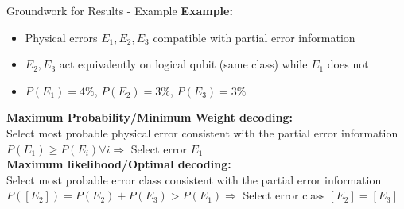 \documentclass{dfki}
\begin{document}
\begin{frame}{Groundwork for Results - Example}
\textbf{Example:}
\begin{itemize}
	\item Physical errors $E_{1}, E_{2}, E_{3}$ compatible with partial error information\\
	\pause
	\item $E_{2}, E_{3}$ act equivalently on logical qubit (same class) while $E_{1}$ does not\\
	\pause
	\item $P(E_{1})=4\%$, $P(E_{2})=3\%$, $P(E_{3})=3\%$
\end{itemize}
\pause
\vspace{0.5cm}
\textbf{Maximum Probability/Minimum Weight decoding:}\\
Select most probable physical error consistent with the partial error information\\
\pause
$P(E_{1})\geq P(E_{i})\forall i \Rightarrow$ Select error $E_{1}$\\
\pause
\vspace{0.5cm}
\textbf{Maximum likelihood/Optimal decoding:}\\
Select most probable error class consistent with the partial error information\\
\pause
$P([E_{2}])=P(E_{2})+P(E_{3})> P(E_{1})\Rightarrow$ Select error class $[E_{2}]=[E_{3}]$
\end{frame}
\end{document}
